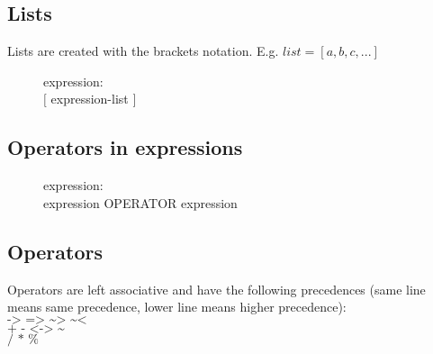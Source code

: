 \documentclass[12pt]{article}
\begin{document}
\subsection{Lists}
Lists are created with the brackets notation. E.g. $list = [a, b, c, ...]$
\begin{description}
  \item[]expression: \hfill \\
    $[$ expression-list $]$
\end{description}

\subsection{Operators in expressions}
\begin{description}
  \item[]expression: \hfill \\
    expression OPERATOR expression
\end{description}

\subsection{Operators}
Operators are left associative and have the following precedences (same line
means same precedence, lower line means higher precedence):\\
$\texttt{-> => \textasciitilde> \textasciitilde<}$\\
$\texttt{+ - <-> \textasciitilde}$\\
$\texttt{/ * \%}$
\end{document}
